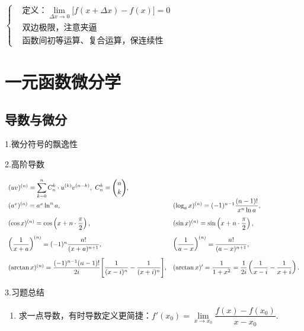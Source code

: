 \documentclass[UTF8]{ctexart}
\numberwithin{equation}{section}
\numberwithin{figure}{section}
\numberwithin{table}{section}
\newcommand\no{\noindent}
\newcommand\dis{\displaystyle}
\newcommand\limit{\dis\lim\limits}
\newcommand\sumkn{\dis\sum\limits_{k=0}^n}
\begin{document}
\begin{spacing}{2}
\begin{enumerate}[itemindent=1.4em, label=(\arabic*)]
$\left\{\begin{aligned}
&\text{定义：}\limit_{\Delta x\to0}\big[f(x+\Delta x)-f(x)\big]=0\\
&\text{双边极限，注意夹逼}\\
&\text{函数间初等运算、复合运算，保连续性}
\end{aligned}\right.$

\end{enumerate}

\newpage

\section{一元函数微分学}

\subsection{导数与微分}

\no1.微分符号的飘逸性

\no2.高阶导数

$\begin{array}{ll}
(uv)^{(n)}=\sumkn C_{n}^k\cdot u^{(k)}v^{(n-k)},\  C_{n}^k=\binom{n}{k},&\\
(a^x)^{(n)}=a^x\ln^n a,& (\log_a x)^{(n)}=(-1)^{n-1}
\dfrac{(n-1)!}{x^n\ln a},\vspace{0.3cm}\\
(\cos x)^{(n)}=\cos\left(x+n\cdot\dfrac{\pi}{2}\right),&
(\sin x)^{(n)}=\sin\left(x+n\cdot\dfrac{\pi}{2}\right),\vspace{0.3cm}\\
\left(\dfrac{1}{x+a}\right)^{(n)}=(-1)^n\dfrac{n!}{(x+a)^{n+1}}, &
\left(\dfrac{1}{a-x}\right)^{(n)}=\dfrac{n!}{(a-x)^{n+1}},\vspace{0.3cm}\\
(\arctan x)^{(n)}=\dfrac{(-1)^{n-1}(n-1)!}{2i}\Bigg[
\dfrac{1}{(x-i)^n}-\dfrac{1}{(x+i)^n}\Bigg],&
(\arctan x)'=\dfrac{1}{1+x^2}=\dfrac{1}{2i}\left(
\dfrac{1}{x-i}-\dfrac{1}{x+i}\right).\\
\end{array}$

\vspace{0.5cm}

\no3.习题总结

\begin{enumerate}[itemindent=1.4em, label=(\arabic*)]

\item 求一点导数，有时导数定义更简捷：$f'(x_0)=\limit_{x\to x_0}\dfrac{f(x)-f(x_0)}{x-x_0}.$


\end{enumerate}
\end{spacing}
\end{document}
